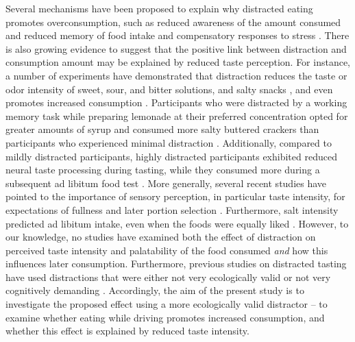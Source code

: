\documentclass[authordate, empirical]{jote-new-article}
\begin{document}
Several mechanisms have been proposed to explain why distracted eating promotes overconsumption, such as reduced awareness of the amount consumed and reduced memory of food intake \parencites{Robinson2013}{Oldham-Cooper2010} and compensatory responses to stress \parencites{Reichenberger2018}{Torres2007}. There is also growing evidence to suggest that the positive link between distraction and consumption amount may be explained by reduced taste perception. For instance, a number of experiments have demonstrated that distraction reduces the taste or odor intensity of sweet, sour, and bitter solutions, and salty snacks \parencites{Hoffmann-Hensel2017}{Liang2018}{Wal2013}, and even promotes increased consumption \parencites{Morris2020}{Wal2013}. Participants who were distracted by a working memory task while preparing lemonade at their preferred concentration opted for greater amounts of syrup and consumed more salty buttered crackers than participants who experienced minimal distraction \parencites{Wal2013}. Additionally, compared to mildly distracted participants, highly distracted participants exhibited reduced neural taste processing during tasting, while they consumed more during a subsequent ad libitum food test \parencites{Duif2020}. More generally, several recent studies have pointed to the importance of sensory perception, in particular taste intensity, for expectations of fullness and later portion selection \parencites[as reviewed in][]{Forde2018}. Furthermore, salt intensity predicted ad libitum intake, even when the foods were equally liked \parencites{Bolhuis2012}. However, to our knowledge, no studies have examined both the effect of distraction on perceived taste intensity and palatability of the food consumed \emph{and} how this influences later consumption. Furthermore, previous studies on distracted tasting have used distractions that were either not very ecologically valid \parencites[e.g. working memory task][]{Wal2013}{Duif2020}{Liang2018} or not very cognitively demanding \parencites[e.g. listening to music,][]{Stroebele2006}. Accordingly, the aim of the present study is to investigate the proposed effect using a more ecologically valid distractor – to examine whether eating while driving promotes increased consumption, and whether this effect is explained by reduced taste intensity.
\end{document}
